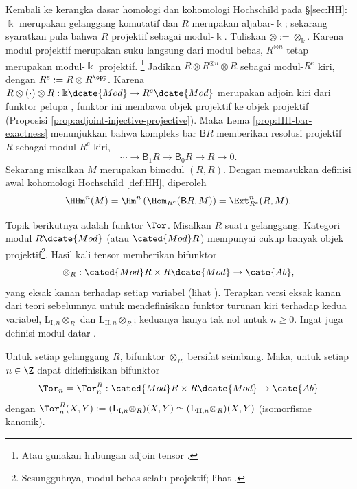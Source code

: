 \begin{contoh}\label{eg:HH-Ext}
Kembali ke kerangka dasar homologi dan kohomologi Hochschild pada
\S\ref{sec:HH}: $\Bbbk$ merupakan gelanggang komutatif dan $R$ merupakan
aljabar-$\Bbbk$; sekarang syaratkan pula bahwa $R$ projektif sebagai
modul-$\Bbbk$. Tuliskan $\otimes:=\otimes_{\Bbbk}$. Karena modul projektif
merupakan suku langsung dari modul bebas, $R^{\otimes n}$ tetap merupakan
modul-$\Bbbk$ projektif.
\footnote{Atau gunakan hubungan adjoin tensor \cite[Teorema 6.6.5]{Li1}.}
Jadikan $R\otimes R^{\otimes n}\otimes R$ sebagai modul-$R^e$ kiri, dengan
$R^e:=R\otimes R^{\opp}$. Karena
$R\otimes(\cdot)\otimes R:\Bbbk\dcate{Mod}\to R^e\dcate{Mod}$ merupakan
adjoin kiri dari funktor pelupa \cite[Korolari 6.6.8]{Li1}, funktor ini
membawa objek projektif ke objek projektif (Proposisi
\ref{prop:adjoint-injective-projective}). Maka Lema
\ref{prop:HH-bar-exactness} menunjukkan bahwa kompleks bar $\mathsf{B}R$
memberikan resolusi projektif $R$ sebagai modul-$R^e$ kiri,
\begin{equation}\label{eqn:bar-proj-resolution}
\cdots\to\mathsf{B}_1R\to\mathsf{B}_0R\to R\to0.
\end{equation}
Sekarang misalkan $M$ merupakan bimodul $(R,R)$. Dengan memasukkan definisi
awal kohomologi Hochschild \ref{def:HH}, diperoleh
\[
\HHm^n(M)=\Hm^n\left(\Hom_{R^e}(\mathsf{B}R,M)\right)
=\Ext^n_{R^e}(R,M).
\]
\end{contoh}

Topik berikutnya adalah funktor $\Tor$. Misalkan $R$ suatu gelanggang. Kategori
modul $R\dcate{Mod}$ (atau $\cated{Mod}R$) mempunyai cukup banyak objek
projektif\footnote{Sesungguhnya, modul bebas selalu projektif; lihat
\cite[Contoh 6.9.6]{Li1}.}. Hasil kali tensor memberikan bifunktor
\[
\otimes_R:\cated{Mod}R\times R\dcate{Mod}\to\cate{Ab},
\]
yang eksak kanan terhadap setiap variabel (lihat \cite[Proposisi 6.9.2]{Li1}).
Terapkan versi eksak kanan dari teori sebelumnya untuk
mendefinisikan funktor turunan kiri terhadap kedua variabel,
$\mathrm{L}_{\mathrm{I},n}\otimes_R$ dan
$\mathrm{L}_{\mathrm{II},n}\otimes_R$; keduanya hanya tak nol untuk $n\geq0$.
Ingat juga definisi modul datar \cite[Definisi 6.9.4]{Li1}.

\begin{definisiproposisi}\label{def:Tor-classical}
Untuk setiap gelanggang $R$, bifunktor $\otimes_R$ bersifat seimbang. Maka,
untuk setiap $n\in\Z$ dapat didefinisikan bifunktor
\[
\Tor_n=\Tor_n^R:\cated{Mod}R\times R\dcate{Mod}\to\cate{Ab}
\]
dengan
$\Tor_n^R(X,Y):=(\mathrm{L}_{\mathrm{I},n}\otimes_R)(X,Y)\simeq
(\mathrm{L}_{\mathrm{II},n}\otimes_R)(X,Y)$ (isomorfisme kanonik).
\end{definisiproposisi}

